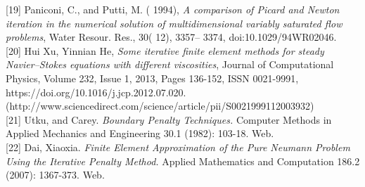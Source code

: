 \documentclass[11pt,twoside,a4paper]{article}
\begin{document}
[19] Paniconi, C., and Putti, M. ( 1994), \textit{A comparison of Picard and Newton iteration in the numerical solution of multidimensional variably saturated flow problems}, Water Resour. Res., 30( 12), 3357– 3374, doi:10.1029/94WR02046.\\

[20] Hui Xu, Yinnian He,
\textit{Some iterative finite element methods for steady Navier–Stokes equations with different viscosities},
Journal of Computational Physics,
Volume 232, Issue 1,
2013,
Pages 136-152,
ISSN 0021-9991,\\
https://doi.org/10.1016/j.jcp.2012.07.020.\\
(http://www.sciencedirect.com/science/article/pii/S0021999112003932)\\

[21] Utku, and Carey. \textit{Boundary Penalty Techniques.} Computer Methods in Applied Mechanics and Engineering 30.1 (1982): 103-18. Web. \\

[22] Dai, Xiaoxia. \textit{Finite Element Approximation of the Pure Neumann Problem Using the Iterative Penalty Method.} Applied Mathematics and Computation 186.2 (2007): 1367-373. Web.\\
\end{document}
